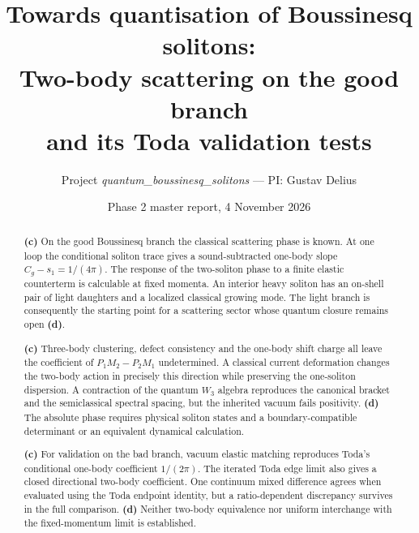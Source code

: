 \documentclass[11pt,a4paper]{article}
\title{Towards quantisation of Boussinesq solitons:\\ Two-body scattering on the good branch\\ and its Toda validation tests}
\author{Project \emph{quantum\_\allowbreak boussinesq\_\allowbreak solitons} --- PI: Gustav Delius}
\date{Phase 2 master report, 4 November 2026}
\newcommand{\Lc}{\textsf{\textbf{(c)}}\xspace}
\newcommand{\Ld}{\textsf{\textbf{(d)}}\xspace}
\theoremstyle{remark}\newtheorem{remark}[proposition]{Remark}
\begin{document}
\maketitle

\begin{abstract}
\Lc On the good Boussinesq branch the classical scattering phase is known.
At one loop the conditional soliton trace gives a sound-subtracted one-body
slope $C_g-s_1=1/(4\pi)$. The response of the two-soliton phase to a finite
elastic counterterm is calculable at fixed momenta. An interior heavy soliton has an
on-shell pair of light daughters and a localized classical growing mode.
The light branch is consequently the starting point for a scattering sector
whose quantum closure remains open \Ld.

\Lc Three-body clustering, defect consistency and the one-body shift charge
all leave the coefficient of $P_1M_2-P_2M_1$ undetermined. A classical current
deformation changes the two-body action in precisely this direction while
preserving the one-soliton dispersion. A contraction of the quantum $W_3$
algebra reproduces the canonical bracket and the semiclassical spectral
spacing, but the inherited vacuum fails positivity. \Ld The absolute phase
requires physical soliton states and a boundary-compatible determinant or an
equivalent dynamical calculation.

\Lc For validation on the bad branch, vacuum elastic matching reproduces
Toda's conditional one-body coefficient $1/(2\pi)$. The iterated Toda edge
limit also gives a closed directional two-body coefficient. One continuum
mixed difference agrees when evaluated using the Toda endpoint identity,
but a ratio-dependent discrepancy survives in the full comparison.
\Ld Neither two-body equivalence nor uniform interchange with the
fixed-momentum limit is established.
\end{abstract}\clearpage
\end{document}
